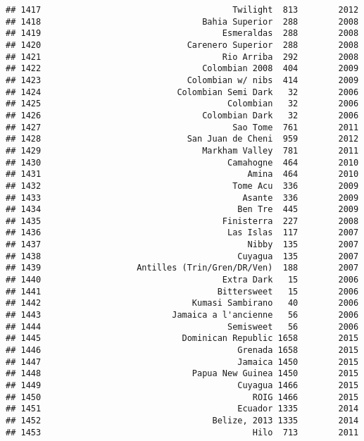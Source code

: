 \documentclass[
]{article}
\begin{document}
\begin{verbatim}
## 1417                                      Twilight  813        2012
## 1418                                Bahia Superior  288        2008
## 1419                                    Esmeraldas  288        2008
## 1420                             Carenero Superior  288        2008
## 1421                                    Rio Arriba  292        2008
## 1422                                Colombian 2008  404        2009
## 1423                             Colombian w/ nibs  414        2009
## 1424                           Colombian Semi Dark   32        2006
## 1425                                     Colombian   32        2006
## 1426                                Colombian Dark   32        2006
## 1427                                      Sao Tome  761        2011
## 1428                             San Juan de Cheni  959        2012
## 1429                                Markham Valley  781        2011
## 1430                                     Camahogne  464        2010
## 1431                                         Amina  464        2010
## 1432                                      Tome Acu  336        2009
## 1433                                        Asante  336        2009
## 1434                                       Ben Tre  445        2009
## 1435                                    Finisterra  227        2008
## 1436                                     Las Islas  117        2007
## 1437                                         Nibby  135        2007
## 1438                                       Cuyagua  135        2007
## 1439                   Antilles (Trin/Gren/DR/Ven)  188        2007
## 1440                                    Extra Dark   15        2006
## 1441                                   Bittersweet   15        2006
## 1442                              Kumasi Sambirano   40        2006
## 1443                          Jamaica a l'ancienne   56        2006
## 1444                                     Semisweet   56        2006
## 1445                            Dominican Republic 1658        2015
## 1446                                       Grenada 1658        2015
## 1447                                       Jamaica 1450        2015
## 1448                              Papua New Guinea 1450        2015
## 1449                                       Cuyagua 1466        2015
## 1450                                          ROIG 1466        2015
## 1451                                       Ecuador 1335        2014
## 1452                                  Belize, 2013 1335        2014
## 1453                                          Hilo  713        2011

\end{verbatim}
\end{document}
